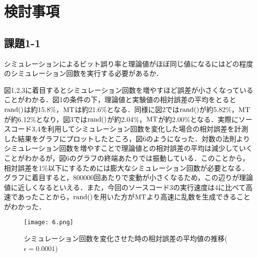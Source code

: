 \documentclass[12pt]{jarticle}
\begin{document}
\section{検討事項}
\subsection{課題1-1}
\begin{shadebox}
    \quad シミュレーションによるビット誤り率と理論値がほぼ同じ値になるにはどの程度のシミュレーション回数を実行する必要があるか．
\end{shadebox}
\vspace{\baselineskip}
図1,2,3に着目するとシミュレーション回数を増やすほど誤差が小さくなっていることがわかる．図1の条件の下，理論値と実験値の相対誤差の平均をとると$\rm{rand()}$は約15.8\%，$\rm{MT}$は約21.6\%となる．同様に図2では$\rm{rand()}$が約5.82\%，$\rm{MT}$が約6.12\%となり，図3では$\rm{rand()}$が約2.04\%，$\rm{MT}$が約2.00\%となる．実際にソースコード3,4を利用してシミュレーション回数を変化した場合の相対誤差を計測した結果をグラフにプロットしたところ，図6のようになった．対数の法則よりシミュレーション回数を増やすことで理論値との相対誤差の平均は減少していくことがわかるが，図6のグラフの終端あたりでは振動している．このことから，相対誤差を1\%以下にするためには膨大なシミュレーション回数が必要となる．グラフに着目すると，800000回あたりで変動が小さくなるため，この辺りが理論値に近しくなるといえる．また，今回のソースコード3の実行速度は4に比べて高速であったことから，$\rm{rand()}$を用いた方が$\rm{MT}$より高速に乱数を生成できることがわかった．
\begin{figure}[H]
    \begin{center}
        \texttt{[image: 6.png]}
    \end{center}
    \caption{シミュレーション回数を変化させた時の相対誤差の平均値の推移($\epsilon=0.0001$)}
    \label{fig1}
\end{figure}
\end{document}
